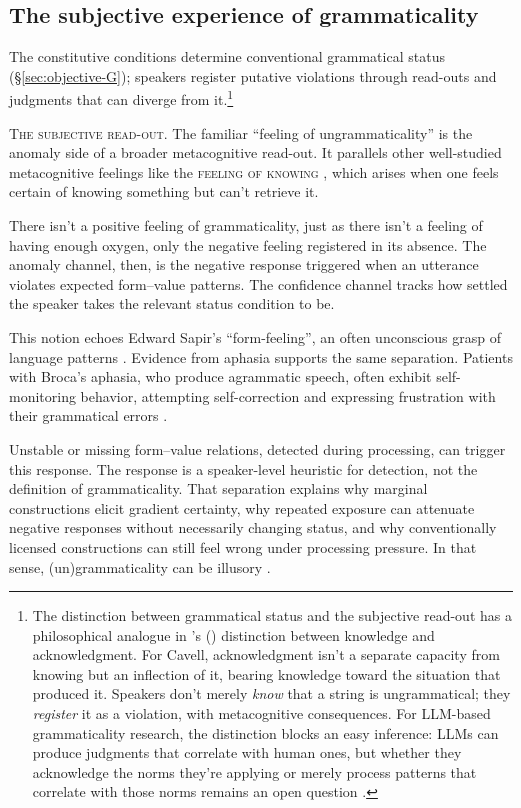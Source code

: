 \documentclass[12pt,letterpaper]{article}
\newcommand{\posscite}[1]{\citeauthor{#1}'s (\citeyear{#1})}
\begin{document}
\subsection{The subjective experience of grammaticality}\label{sec:subjective}

The constitutive conditions determine conventional grammatical status (\S\ref{sec:objective-G}); speakers register putative violations through read-outs and judgments that can diverge from it.\footnote{The distinction between grammatical status and the subjective read-out has a philosophical analogue in \posscite{Cavell1969KnowingAcknowledging} distinction between knowledge and acknowledgment. For Cavell, acknowledgment isn't a separate capacity from knowing but an inflection of it, bearing knowledge toward the situation that produced it. Speakers don't merely \emph{know} that a string is ungrammatical; they \emph{register} it as a violation, with metacognitive consequences. For LLM-based grammaticality research, the distinction blocks an easy inference: LLMs can produce judgments that correlate with human ones, but whether they acknowledge the norms they're applying or merely process patterns that correlate with those norms remains an open question \autocite{Techio2026ClaimTrainingData}.}

\noindent\textsc{The subjective read-out.} The familiar \enquote{feeling of ungrammaticality} is the anomaly side of a broader metacognitive read-out. It parallels other well-studied metacognitive feelings like the \textsc{feeling of knowing} \autocite[FOK;][]{hart1965}, which arises when one feels certain of knowing something but can't retrieve it.

There isn't a positive feeling of grammaticality, just as there isn't a feeling of having enough oxygen, only the negative feeling registered in its absence. The anomaly channel, then, is the negative response triggered when an utterance violates expected form--value patterns. The confidence channel tracks how settled the speaker takes the relevant status condition to be.

This notion echoes Edward Sapir's \enquote{form-feeling}, an often unconscious grasp of language patterns \autocite{Sapir1921, Sapir1927b}. Evidence from aphasia supports the same separation. Patients with Broca's aphasia, who produce agrammatic speech, often exhibit self-monitoring behavior, attempting self-correction and expressing frustration with their grammatical errors \autocite{oomen2005}.

Unstable or missing form--value relations, detected during processing, can trigger this response. The response is a speaker-level heuristic for detection, not the definition of grammaticality. That separation explains why marginal constructions elicit gradient certainty, why repeated exposure can attenuate negative responses without necessarily changing status, and why conventionally licensed constructions can still feel wrong under processing pressure. In that sense, (un)grammaticality can be illusory \parencite{Fanselow2021}.
\end{document}
